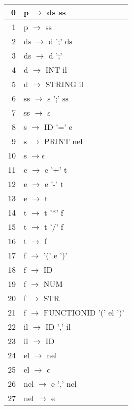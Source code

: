 \vspace{0.5cm}
\begin{center}
\begin{small}
\begin{tabular}{|r|l|}
\hline
0 & p  $\rightarrow$  ds ss     \\
\hline
1 & p  $\rightarrow$  ss         \\
\hline
2 & ds $\rightarrow$ d  ';'  ds  \\
\hline
3 & ds $\rightarrow$  d  ';'     \\
\hline
4 & d  $\rightarrow$ INT  il     \\
\hline
5 & d  $\rightarrow$  STRING  il \\
\hline
6 & ss $\rightarrow$ s  ';'  ss  \\
\hline
7 & ss $\rightarrow$  s          \\
\hline
8 & s  $\rightarrow$ ID '=' e    \\
\hline
9 & s  $\rightarrow$  PRINT  nel       \\
\hline
10 & s $\rightarrow \epsilon$    \\
\hline
11 & e $\rightarrow$ e '+' t    \\
\hline
12 & e $\rightarrow$ e '-' t    \\
\hline
13 & e $\rightarrow$ t           \\
\hline
14 & t $\rightarrow$ t '*' f    \\
\hline
15 & t $\rightarrow$ t '/' f     \\
\hline
16 & t $\rightarrow$ f           \\
\hline
17 & f $\rightarrow$ '(' e ')'   \\
\hline
18 & f $\rightarrow$  ID         \\
\hline
19 & f $\rightarrow$  NUM        \\
\hline
20 & f $\rightarrow$  STR        \\
\hline
21 & f $\rightarrow$  FUNCTIONID '(' el ')'   \\
\hline
22 & il $\rightarrow$ ID ',' il  \\
\hline
23 & il $\rightarrow$ ID         \\
\hline
24 & el $\rightarrow$   nel   \\
\hline
25 & el $\rightarrow$   $\epsilon$   \\
\hline
26 & nel $\rightarrow$   e ',' nel    \\
\hline
27 & nel $\rightarrow$   e   \\
\hline
\end{tabular}
\end{small}
\end{center}
\vspace{0.25cm}

